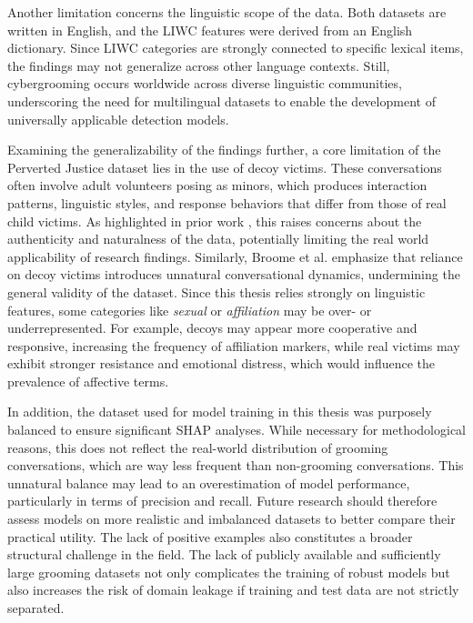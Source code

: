 Another limitation concerns the linguistic scope of the data. Both datasets are written in English, and the LIWC features were derived from an English dictionary. Since LIWC categories are strongly connected to specific lexical items, the findings may not generalize across other language contexts. Still, cybergrooming occurs worldwide across diverse linguistic communities, underscoring the need for multilingual datasets to enable the development of universally applicable detection models.  

Examining the generalizability of the findings further, a core limitation of the Perverted Justice dataset lies in the use of decoy victims. These conversations often involve adult volunteers posing as minors, which produces interaction patterns, linguistic styles, and response behaviors that differ from those of real child victims. As highlighted in prior work \cite{chiangandgrant2017online}, this raises concerns about the authenticity and naturalness of the data, potentially limiting the real world applicability of research findings. Similarly, Broome et al. \cite{broome2020psycholinguistic} emphasize that reliance on decoy victims introduces unnatural conversational dynamics, undermining the general validity of the dataset. Since this thesis relies strongly on linguistic features, some categories like \textit{sexual} or \textit{affiliation} may be over- or underrepresented. For example, decoys may appear more cooperative and responsive, increasing the frequency of affiliation markers, while real victims may exhibit stronger resistance and emotional distress, which would influence the prevalence of affective terms.  

In addition, the dataset used for model training in this thesis was purposely balanced to ensure significant SHAP analyses. While necessary for methodological reasons, this does not reflect the real-world distribution of grooming conversations, which are way less frequent than non-grooming conversations. This unnatural balance may lead to an overestimation of model performance, particularly in terms of precision and recall. Future research should therefore assess models on more realistic and imbalanced datasets to better compare their practical utility. The lack of positive examples also constitutes a broader structural challenge in the field. The lack of publicly available and sufficiently large grooming datasets not only complicates the training of robust models but also increases the risk of domain leakage if training and test data are not strictly separated.  

